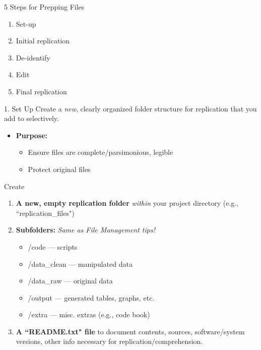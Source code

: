 \documentclass[12pt, compress]{beamer} %
\renewcommand{\texttt}[2][ceruleanblue]{\textcolor{#1}{\ttfamily #2}}%
\let\noteitem\item %
\renewcommand{\item}{ 
	\noteitem\vspace{\fill}
	}
\begin{document}
	\begin{frame}{5 Steps for Prepping Files}
			\begin{enumerate}
				\item Set-up
				\item Initial replication
				\item De-identify
				\item Edit
				\item Final replication
			\end{enumerate}
	\end{frame}
	  
		 \begin{frame}{1. Set Up}
		 	Create a \textit{new}, clearly organized folder structure for replication that you add to selectively.
		 	
		 	\begin{itemize}
		 		\item \textbf{Purpose:} 
		 		\begin{itemize}
		 			\item Ensure files are \textcolor{burntorange}{complete/parsimonious, legible}
		 			\item Protect original files
		 		\end{itemize}
		 	\end{itemize}
		 	
		 \end{frame}
		  
		 \begin{frame}{Create}
		 	\begin{enumerate}
		 		\item \textbf{A new, empty replication folder} \textit{within} your project directory (e.g., ``\texttt{replication\_files}") 
		 		\item \textbf{Subfolders:} \textit{Same as File Management tips!}
		 			\begin{itemize}
		 				\item \texttt{/code} --- scripts
		 				\item \texttt{/data\_clean} --- manipulated data
		 				\item \texttt{/data\_raw} --- original data
		 				\item \texttt{/output} --- generated tables, graphs, etc.
		 				\item \texttt{/extra} --- misc. extras (e.g., code book)
		 			\end{itemize}
		 			\item \textbf{A ``README.txt" file} to document contents, sources, software/system versions, other info necessary for replication/comprehension.
		 	\end{enumerate}
		 \end{frame}
		
\end{document}
